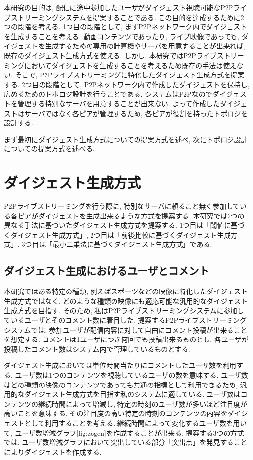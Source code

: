 本研究の目的は, 配信に途中参加したユーザがダイジェスト視聴可能なP2Pライブストリーミングシステムを提案することである. この目的を達成するために2つの段階を考える. 1つ目の段階として, まずP2Pネットワーク内でダイジェストを生成することを考える. 動画コンテンツであったり, ライブ映像であっても, ダイジェストを生成するための専用の計算機やサーバを用意することが出来れば, 既存のダイジェスト生成方式を使える. しかし, 本研究ではP2Pライブストリーミングにおいてダイジェストを生成することを考えるため既存の手法は使えない. そこで, P2Pライブストリーミングに特化したダイジェスト生成方式を提案する. 2つ目の段階として, P2Pネットワーク内で作成したダイジェストを保持し, 広めるためのトポロジ設計を行うことである. システムはP2Pなのでダイジェストを管理する特別なサーバを用意することが出来ない. よって作成したダイジェストはサーバではなく各ピアが管理するため, 各ピアが役割を持ったトポロジを設計する.

まず最初にダイジェスト生成方式についての提案方式を述べ, 次にトポロジ設計についての提案方式を述べる.


\section{ダイジェスト生成方式}
P2Pライブストリーミングを行う際に, 特別なサーバに頼ること無く参加している各ピアがダイジェストを生成出来るような方式を提案する. 本研究では3つの異なる手法に基づいたダイジェスト生成方式を提案する. 1つ目は「閾値に基づくダイジェスト生成方式」, 2つ目は「前後比較に基づくダイジェスト生成方式」, 3つ目は「最小二乗法に基づくダイジェスト生成方式」である.

\subsection{ダイジェスト生成におけるユーザとコメント}
本研究ではある特定の種類, 例えばスポーツなどの映像に特化したダイジェスト生成方式ではなく, どのような種類の映像にも適応可能な汎用的なダイジェスト生成方式を目指す. そのため, 私はP2Pライブストリーミングシステムに参加しているユーザとそのコメント数に着目した. 提案するP2Pライブストリーミングシステムでは, 参加ユーザが配信内容に対して自由にコメント投稿が出来ることを想定する. コメントは1ユーザにつき何回でも投稿出来るものとし, 各ユーザが投稿したコメント数はシステム内で管理しているものとする.

ダイジェスト生成においては単位時間当たりにコメントしたユーザ数を利用する. ユーザ数は1つのコンテンツを視聴しているユーザの数を意味する. ユーザ数はどの種類の映像のコンテンツであっても共通の指標として利用できるため, 汎用的なダイジェスト生成方式を目指す私のシステムに適している. ユーザ数はコンテンツの継続時間によって増減し, 特定の時刻のユーザ数が多いほど注目度が高いことを意味する. その注目度の高い特定の時刻のコンテンツの内容をダイジェストとして利用することを考える. 継続時間によって変化するユーザ数を用いて, ユーザ数増減グラフ\ref{fig:zogen}を作成することが出来る. 提案する3つの方式では, ユーザ数増減グラフにおいて突出している部分「突出点」を発見することによりダイジェストを作成する.

